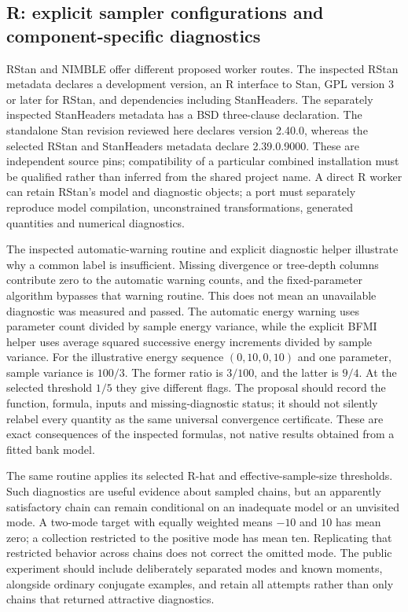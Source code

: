 \subsection{R: explicit sampler configurations and component-specific diagnostics}

RStan and NIMBLE offer different proposed worker routes. The inspected RStan metadata declares a development version, an R interface to Stan, GPL version 3 or later for RStan, and dependencies including StanHeaders. The separately inspected StanHeaders metadata has a BSD three-clause declaration. The standalone Stan revision reviewed here declares version 2.40.0, whereas the selected RStan and StanHeaders metadata declare 2.39.0.9000. These are independent source pins; compatibility of a particular combined installation must be qualified rather than inferred from the shared project name. A direct R worker can retain RStan's model and diagnostic objects; a port must separately reproduce model compilation, unconstrained transformations, generated quantities and numerical diagnostics.~\citep{exec25_bsw_rstan,exec25_bsw_stan}

The inspected automatic-warning routine and explicit diagnostic helper illustrate why a common label is insufficient. Missing divergence or tree-depth columns contribute zero to the automatic warning counts, and the fixed-parameter algorithm bypasses that warning routine. This does not mean an unavailable diagnostic was measured and passed. The automatic energy warning uses parameter count divided by sample energy variance, while the explicit BFMI helper uses average squared successive energy increments divided by sample variance. For the illustrative energy sequence $(0,10,0,10)$ and one parameter, sample variance is $100/3$. The former ratio is $3/100$, and the latter is $9/4$. At the selected threshold $1/5$ they give different flags. The proposal should record the function, formula, inputs and missing-diagnostic status; it should not silently relabel every quantity as the same universal convergence certificate. These are exact consequences of the inspected formulas, not native results obtained from a fitted bank model.~\citep{exec25_bsw_rstan,exec25_bsw_choice}

The same routine applies its selected R-hat and effective-sample-size thresholds. Such diagnostics are useful evidence about sampled chains, but an apparently satisfactory chain can remain conditional on an inadequate model or an unvisited mode. A two-mode target with equally weighted means $-10$ and $10$ has mean zero; a collection restricted to the positive mode has mean ten. Replicating that restricted behavior across chains does not correct the omitted mode. The public experiment should include deliberately separated modes and known moments, alongside ordinary conjugate examples, and retain all attempts rather than only chains that returned attractive diagnostics.~\citep{exec25_bsw_rstan,exec25_bsw_choice}

